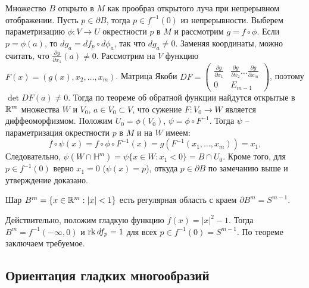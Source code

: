 \begin{myproof}
    Множество $B$ открыто в $M$ как прообраз открытого луча при непрерывном отображении.
    Пусть $p \in \partial B$, тогда $p \in f^{-1}(0)$ из непрерывности. Выберем параметризацию $\phi: V \to U$ окрестности $p$ в $M$ и рассмотрим $g = f \circ \phi$. Если $p = \phi(a)$, то $dg_a = df_p \circ d\phi_a$, так что $dg_a \ne 0$. Заменяя координаты, можно считать, что $\frac{\partial g}{\partial x_1}(a) \ne 0$.
    Рассмотрим на $V$ функцию $F(x) = (g(x), x_2, \dots, x_m)$. Матрица Якоби $DF = \begin{pmatrix} \frac{\partial g}{\partial x_1} & \frac{\partial g}{\partial x_2} \dots \frac{\partial g}{\partial x_m} \\ 0 & E_{m-1} \end{pmatrix}$, поэтому $\det DF(a) \ne 0$. Тогда по теореме об обратной функции найдутся открытые в $\mathbb{R}^m$ множества $W$ и $V_0$, $a \in V_0 \subset V$, что сужение $F: V_0 \to W$ является диффеоморфизмом.
    Положим $U_0 = \phi(V_0)$, $\psi = \phi \circ F^{-1}$. Тогда $\psi$ -- параметризация окрестности $p$ в $M$ и на $W$ имеем:
    \[
    f \circ \psi(x) = f \circ \phi \circ F^{-1}(x) = g(F^{-1}(x_1, \dots, x_m)) = x_1,
    \]
    Следовательно, $\psi(W \cap \mathbb{H}^m) = \psi\{x \in W : x_1 < 0\} = B \cap U_0$. Кроме того, для $p \in f^{-1}(0)$ верно $x_1 = 0$ ($\psi(x) = p$), откуда $p \in \partial B$ по замечанию выше и утверждение доказано.
\end{myproof}

\begin{corollary}
    Шар $B^m = \{x \in \mathbb{R}^m : |x| < 1\}$ есть регулярная область с краем $\partial B^m = S^{m-1}$.
\end{corollary}

\begin{myproof}
    Действительно, положим гладкую функцию $f(x) = |x|^2 - 1$. Тогда $B^m = f^{-1}(-\infty, 0)$ и $\operatorname{rk} df_p = 1$ для всех $p \in f^{-1}(0) = S^{m-1}$.
	По теореме заключаем требуемое.
\end{myproof}


\subsection{Ориентация гладких многообразий}

